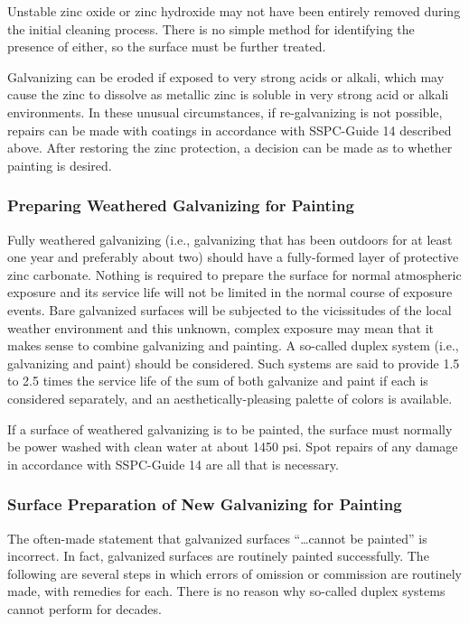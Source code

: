 Unstable zinc oxide or zinc hydroxide may not have been entirely removed during the initial cleaning process.
There is no simple method for identifying the presence of either, so the surface must be further treated.

Galvanizing can be eroded if exposed to very strong acids or alkali, which may cause the zinc to dissolve as
metallic zinc is soluble in very strong acid or alkali environments. In these unusual circumstances, if re-galvanizing is
not possible, repairs can be made with coatings in accordance with SSPC-Guide 14 described above. After restoring
the zinc protection, a decision can be made as to whether painting is desired.


\subsubsection{Preparing Weathered Galvanizing for Painting}
Fully weathered galvanizing (i.e., galvanizing that has been outdoors for at least one year and preferably about
two) should have a fully-formed layer of protective zinc carbonate. Nothing is required to prepare the surface for
normal atmospheric exposure and its service life will not be limited in the normal course of exposure events. Bare
galvanized surfaces will be subjected to the vicissitudes of the local weather environment and this unknown, complex
exposure may mean that it makes sense to combine galvanizing and painting. A so-called duplex system (i.e.,
galvanizing and paint) should be considered. Such systems are said to provide 1.5 to 2.5 times the service life of the
sum of both galvanize and paint if each is considered separately, and an aesthetically-pleasing palette of colors is
available.

If a surface of weathered galvanizing is to be painted, the surface must normally be power washed with clean
water at about 1450 psi. Spot repairs of any damage in accordance with SSPC-Guide 14 are all that is necessary.


\subsubsection{Surface Preparation of New Galvanizing for Painting}
The often-made statement that galvanized surfaces “…cannot be painted” is incorrect. In fact, galvanized
surfaces are routinely painted successfully. The following are several steps in which errors of omission or
commission are routinely made, with remedies for each. There is no reason why so-called duplex systems cannot
perform for decades.


